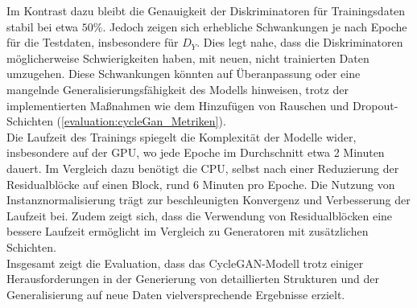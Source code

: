 Im Kontrast dazu bleibt die Genauigkeit der Diskriminatoren für Trainingsdaten stabil bei etwa $50\%$. Jedoch zeigen sich erhebliche Schwankungen je nach Epoche für die Testdaten, insbesondere für $D_Y$. Dies legt nahe, dass die Diskriminatoren möglicherweise Schwierigkeiten haben, mit neuen, nicht trainierten Daten umzugehen. Diese Schwankungen könnten auf Überanpassung oder eine mangelnde Generalisierungsfähigkeit des Modells hinweisen, trotz der implementierten Maßnahmen wie dem Hinzufügen von Rauschen und Dropout-Schichten (\ref{evaluation:cycleGan_Metriken}).
\\\newline
Die Laufzeit des Trainings spiegelt die Komplexität der Modelle wider, insbesondere auf der GPU, wo jede Epoche im Durchschnitt etwa 2 Minuten dauert. Im Vergleich dazu benötigt die CPU, selbst nach einer Reduzierung der Residualblöcke auf einen Block, rund 6 Minuten pro Epoche. Die Nutzung von Instanznormalisierung trägt zur beschleunigten Konvergenz und Verbesserung der Laufzeit bei. Zudem zeigt sich, dass die Verwendung von Residualblöcken eine bessere Laufzeit ermöglicht im Vergleich zu Generatoren mit zusätzlichen Schichten. 
\\\newline
Insgesamt zeigt die Evaluation, dass das CycleGAN-Modell trotz einiger Herausforderungen in der Generierung von detaillierten Strukturen und der Generalisierung auf neue Daten vielversprechende Ergebnisse erzielt.

